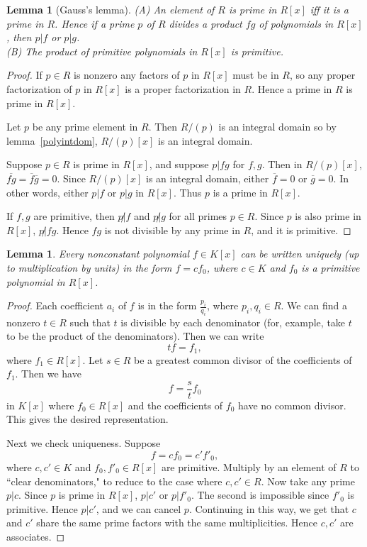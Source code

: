 \documentclass{article}
\theoremstyle{norm}
\newtheorem{lemma}[theorem]{Lemma}
\begin{document}
\begin{lemma}[Gauss's lemma]\label{gausslemma}
(A) An element of $R$ is prime in $R[x]$ iff it is a prime in $R$. Hence if a prime $p$ of $R$ divides a product $fg$ of polynomials in $R[x]$, then $p|f$ or $p|g$.\\
(B) The product of primitive polynomials in $R[x]$ is primitive.
\end{lemma}
\begin{proof}
If $p\in R$ is nonzero any factors of $p$ in $R[x]$ must be in $R$, so any proper factorization of $p$ in $R[x]$ is a proper factorization in $R$. Hence a prime in $R$ is prime in $R[x]$.

Let $p$ be any prime element in $R$. 
Then $R/(p)$ is an integral domain so by lemma~\ref{polyintdom}, $R/(p)[x]$ is an integral domain.

Suppose $p\in R$ is prime in $R[x]$, and suppose $p|fg$ for $f,g$. 
Then in $R/(p)[x]$, $\overline{fg}=\overline{f}\overline{g}=0$. 
Since $R/(p)[x]$ is an integral domain, either $\overline{f}=0$ or $\overline{g}=0$. 
In other words, either $p|f$ or $p|g$ in $R[x]$. Thus $p$ is a prime in $R[x]$.

If $f,g$ are primitive, then $p\not|  f$ and $p\not| g$ for all primes $p\in R$. Since $p$ is also prime in $R[x]$, $p\not| fg$. Hence $fg$ is not divisible by any prime in $R$, and it is primitive.
\end{proof}
\begin{lemma}\label{consttimesprimitive}
Every nonconstant polynomial $f\in K[x]$ can be written uniquely (up to multiplication by units) in the form $f=cf_0$, where $c\in K$ and $f_0$ is a primitive polynomial in $R[x]$.
\end{lemma}
\begin{proof}
Each coefficient $a_i$ of $f$ is in the form $\frac{p_i}{q_i}$, where $p_i,q_i\in R$. We can find a nonzero $t\in R$ such that $t$ is divisible by each denominator (for, example, take $t$ to be the product of the denominators). Then we can write
\[tf=f_1,\]
where $f_1\in R[x]$. Let $s\in R$ be a greatest common divisor of the coefficients of $f_1$. Then we have
\[f=\frac{s}{t}f_0\]
in $K[x]$ where $f_0\in R[x]$ and the coefficients of $f_0$ have no common divisor. This gives the desired representation.

Next we check uniqueness. Suppose
\[f=cf_0=c'f'_0,\]
where $c,c'\in K$ and $f_0,f'_0\in R[x]$ are primitive. Multiply by an element of $R$ to ``clear denominators," to reduce to the case where $c,c'\in R$. Now take any prime $p|c$. Since $p$ is prime in $R[x]$, $p|c'$ or $p|f'_0$. The second is impossible since $f'_0$ is primitive. Hence $p|c'$, and we can cancel $p$. Continuing in this way, we get that $c$ and $c'$ share the same prime factors with the same multiplicities. Hence $c,c'$ are associates.
\end{proof}
\end{document}
